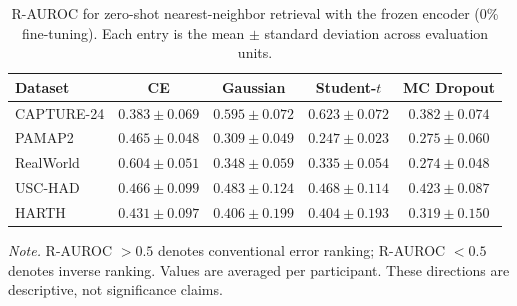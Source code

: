 \begin{table}[t]
\centering
\caption{R-AUROC for zero-shot nearest-neighbor retrieval with the frozen encoder (0\% fine-tuning). Each entry is the mean $\pm$ standard deviation across evaluation units.}
\label{tab:har_zero_shot_0}
\small
\setlength{\tabcolsep}{9pt}
\renewcommand{\arraystretch}{1.17}
\begin{tabular}{@{}lcccc@{}}
\toprule
Dataset & CE & Gaussian & Student-$t$ & MC Dropout \\
\midrule
CAPTURE-24 & $0.383 \pm 0.069$ & $0.595 \pm 0.072$ & $0.623 \pm 0.072$ & $0.382 \pm 0.074$ \\
PAMAP2 & $0.465 \pm 0.048$ & $0.309 \pm 0.049$ & $0.247 \pm 0.023$ & $0.275 \pm 0.060$ \\
RealWorld & $0.604 \pm 0.051$ & $0.348 \pm 0.059$ & $0.335 \pm 0.054$ & $0.274 \pm 0.048$ \\
USC-HAD & $0.466 \pm 0.099$ & $0.483 \pm 0.124$ & $0.468 \pm 0.114$ & $0.423 \pm 0.087$ \\
HARTH & $0.431 \pm 0.097$ & $0.406 \pm 0.199$ & $0.404 \pm 0.193$ & $0.319 \pm 0.150$ \\
\bottomrule
\end{tabular}
\par\vspace{3pt}
\begin{minipage}{0.94\textwidth}
\footnotesize\emph{Note.} R-AUROC $>0.5$ denotes conventional error ranking; R-AUROC $<0.5$ denotes inverse ranking. Values are averaged per participant. These directions are descriptive, not significance claims.
\end{minipage}
\end{table}
